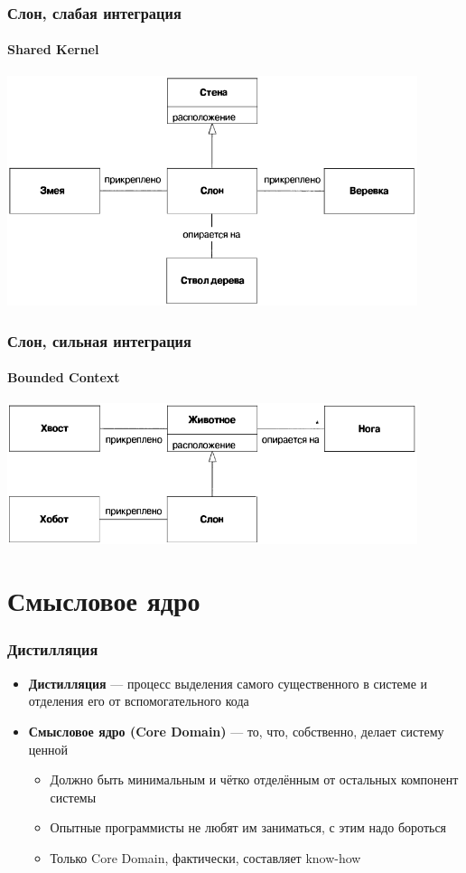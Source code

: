 \documentclass[xetex,mathserif,serif]{beamer}
\begin{document}
	\begin{frame}
		\frametitle{Слон, слабая интеграция}
		\framesubtitle{Shared Kernel}
		\begin{center}
			\includegraphics[width=0.9\textwidth]{elephantSharedKernel.png}
		\end{center}
	\end{frame}

	\begin{frame}
		\frametitle{Слон, сильная интеграция}
		\framesubtitle{Bounded Context}
		\begin{center}
			\includegraphics[width=0.9\textwidth]{elephantSingleBoundedContext.png}
		\end{center}
	\end{frame}

	\section{Смысловое ядро}

	\begin{frame}
		\frametitle{Дистилляция}
		\begin{itemize}
			\item \textbf{Дистилляция} --- процесс выделения самого существенного в системе и отделения его от вспомогательного кода
			\item \textbf{Смысловое ядро (Core Domain)} --- то, что, собственно, делает систему ценной
			\begin{itemize}
				\item Должно быть минимальным и чётко отделённым от остальных компонент системы
				\item Опытные программисты не любят им заниматься, с этим надо бороться
				\item Только Core Domain, фактически, составляет know-how
			\end{itemize}
		\end{itemize}
	\end{frame}
\end{document}
